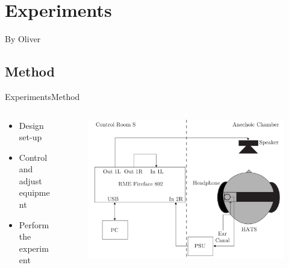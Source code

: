 \section{Experiments}
\begin{frame}{By Oliver}
\end{frame}

\subsection{Method}
\begin{frame}{Experiments}{Method}		
	\begin{columns}
		\begin{column}{0.5\textwidth}
			\begin{itemize}
				\item Design set-up
				\item Control and adjust equipment
				\item Perform the experiment
			\end{itemize}	
		\end{column}
		\begin{column}{0.5\textwidth} 
			\begin{figure}
				\includegraphics[width=1\textwidth]{figures/SetupDiagram.pdf}
			\end{figure}
		\end{column}
	\end{columns}
\end{frame}


